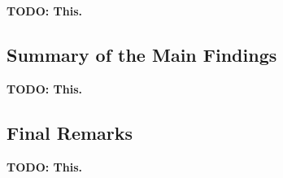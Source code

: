 
\textbf{TODO: This.}

\subsection{Summary of the Main Findings}\label{subsec:summary-of-the-main-findings}

\textbf{TODO: This.}

\subsection{Final Remarks}\label{subsec:final-remarks}

\textbf{TODO: This.}
